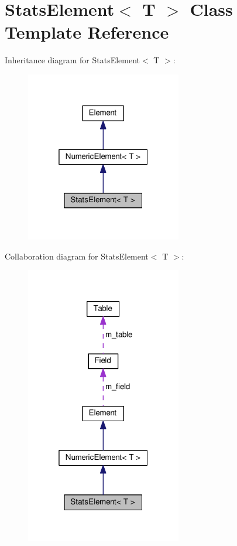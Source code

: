 \hypertarget{classStatsElement}{}\section{Stats\+Element$<$ T $>$ Class Template Reference}
\label{classStatsElement}


Inheritance diagram for Stats\+Element$<$ T $>$\+:\nopagebreak
\begin{figure}[H]
\begin{center}
\leavevmode
\includegraphics[width=193pt]{classStatsElement__inherit__graph}
\end{center}
\end{figure}


Collaboration diagram for Stats\+Element$<$ T $>$\+:\nopagebreak
\begin{figure}[H]
\begin{center}
\leavevmode
\includegraphics[width=193pt]{classStatsElement__coll__graph}
\end{center}
\end{figure}
